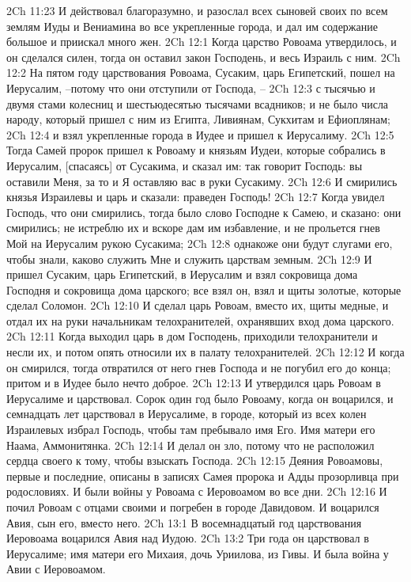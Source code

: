 2Ch 11:23  И действовал благоразумно, и разослал всех сыновей своих по всем землям Иуды и Вениамина во все укрепленные города, и дал им содержание большое и приискал много жен.
2Ch 12:1  Когда царство Ровоама утвердилось, и он сделался силен, тогда он оставил закон Господень, и весь Израиль с ним.
2Ch 12:2  На пятом году царствования Ровоама, Сусаким, царь Египетский, пошел на Иерусалим, --потому что они отступили от Господа, --
2Ch 12:3  с тысячью и двумя стами колесниц и шестьюдесятью тысячами всадников; и не было числа народу, который пришел с ним из Египта, Ливиянам, Сукхитам и Ефиоплянам;
2Ch 12:4  и взял укрепленные города в Иудее и пришел к Иерусалиму.
2Ch 12:5  Тогда Самей пророк пришел к Ровоаму и князьям Иудеи, которые собрались в Иерусалим, [спасаясь] от Сусакима, и сказал им: так говорит Господь: вы оставили Меня, за то и Я оставляю вас в руки Сусакиму.
2Ch 12:6  И смирились князья Израилевы и царь и сказали: праведен Господь!
2Ch 12:7  Когда увидел Господь, что они смирились, тогда было слово Господне к Самею, и сказано: они смирились; не истреблю их и вскоре дам им избавление, и не прольется гнев Мой на Иерусалим рукою Сусакима;
2Ch 12:8  однакоже они будут слугами его, чтобы знали, каково служить Мне и служить царствам земным.
2Ch 12:9  И пришел Сусаким, царь Египетский, в Иерусалим и взял сокровища дома Господня и сокровища дома царского; все взял он, взял и щиты золотые, которые сделал Соломон.
2Ch 12:10  И сделал царь Ровоам, вместо их, щиты медные, и отдал их на руки начальникам телохранителей, охранявших вход дома царского.
2Ch 12:11  Когда выходил царь в дом Господень, приходили телохранители и несли их, и потом опять относили их в палату телохранителей.
2Ch 12:12  И когда он смирился, тогда отвратился от него гнев Господа и не погубил его до конца; притом и в Иудее было нечто доброе.
2Ch 12:13  И утвердился царь Ровоам в Иерусалиме и царствовал. Сорок один год было Ровоаму, когда он воцарился, и семнадцать лет царствовал в Иерусалиме, в городе, который из всех колен Израилевых избрал Господь, чтобы там пребывало имя Его. Имя матери его Наама, Аммонитянка.
2Ch 12:14  И делал он зло, потому что не расположил сердца своего к тому, чтобы взыскать Господа.
2Ch 12:15  Деяния Ровоамовы, первые и последние, описаны в записях Самея пророка и Адды прозорливца при родословиях. И были войны у Ровоама с Иеровоамом во все дни.
2Ch 12:16  И почил Ровоам с отцами своими и погребен в городе Давидовом. И воцарился Авия, сын его, вместо него.
2Ch 13:1  В восемнадцатый год царствования Иеровоама воцарился Авия над Иудою.
2Ch 13:2  Три года он царствовал в Иерусалиме; имя матери его Михаия, дочь Уриилова, из Гивы. И была война у Авии с Иеровоамом.
